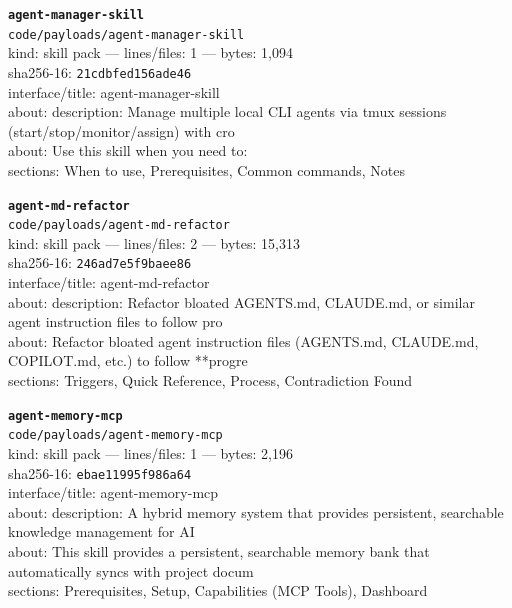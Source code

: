 \noindent\textbf{\texttt{agent-manager-skill}}\\
\texttt{code/payloads/agent-manager-skill}\\
kind: skill pack --- lines/files: 1 --- bytes: 1,094\\
sha256-16: \texttt{21cdbfed156ade46}\\
interface/title: agent-manager-skill\\
about: description: Manage multiple local CLI agents via tmux sessions (start/stop/monitor/assign) with cro\\
about: Use this skill when you need to:\\
sections: When to use, Prerequisites, Common commands, Notes\\
\vspace*{6.0pt}

\noindent\textbf{\texttt{agent-md-refactor}}\\
\texttt{code/payloads/agent-md-refactor}\\
kind: skill pack --- lines/files: 2 --- bytes: 15,313\\
sha256-16: \texttt{246ad7e5f9baee86}\\
interface/title: agent-md-refactor\\
about: description: Refactor bloated AGENTS.md, CLAUDE.md, or similar agent instruction files to follow pro\\
about: Refactor bloated agent instruction files (AGENTS.md, CLAUDE.md, COPILOT.md, etc.) to follow **progre\\
sections: Triggers, Quick Reference, Process, Contradiction Found\\
\vspace*{6.0pt}
\newpage

\noindent\textbf{\texttt{agent-memory-mcp}}\\
\texttt{code/payloads/agent-memory-mcp}\\
kind: skill pack --- lines/files: 1 --- bytes: 2,196\\
sha256-16: \texttt{ebae11995f986a64}\\
interface/title: agent-memory-mcp\\
about: description: A hybrid memory system that provides persistent, searchable knowledge management for AI\\
about: This skill provides a persistent, searchable memory bank that automatically syncs with project docum\\
sections: Prerequisites, Setup, Capabilities (MCP Tools), Dashboard\\
\vspace*{6.0pt}

